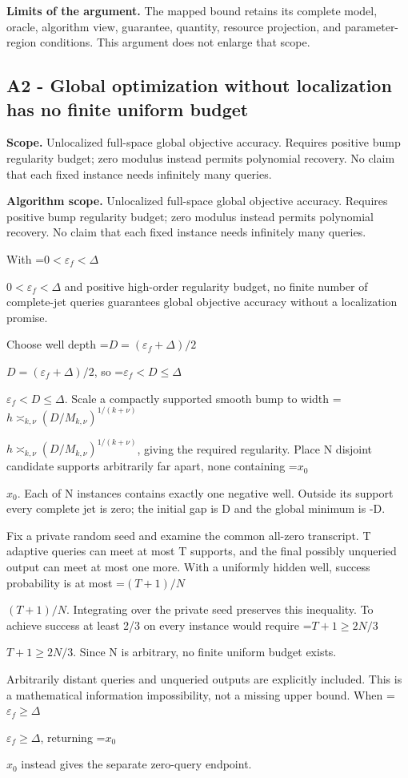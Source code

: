\documentclass[10pt,a4paper]{article}
\newcommand{\AtlasMath}[1]{\par\begingroup\centering\setbox0=\hbox{$\displaystyle #1$}\ifdim\wd0>1.4\linewidth\typeout{ATLAS WIDE FORMULA: \the\wd0}\fi\ifdim\wd0>\linewidth\resizebox{\linewidth}{!}{\box0}\else\box0\fi\par\endgroup}
\newcommand{\AtlasInlineMath}[1]{\begingroup\setbox0=\hbox{$#1$}\ifdim\wd0>.4\linewidth\endgroup\AtlasMath{#1}\else\endgroup$#1$\fi}
\begin{document}
\textbf{Limits of the argument.} The mapped bound retains its complete model, oracle, algorithm view, guarantee, quantity, resource projection, and parameter-region conditions. This argument does not enlarge that scope.

\subsection{A2 - Global optimization without localization has no finite uniform budget}
\textbf{Scope.} Unlocalized full-space global objective accuracy. Requires positive bump regularity budget; zero modulus instead permits polynomial recovery. No claim that each fixed instance needs infinitely many queries.

\textbf{Algorithm scope.} Unlocalized full-space global objective accuracy. Requires positive bump regularity budget; zero modulus instead permits polynomial recovery. No claim that each fixed instance needs infinitely many queries.

With \AtlasInlineMath{0<\varepsilon_f<\Delta} and positive high-order regularity budget, no finite number of complete-jet queries guarantees global objective accuracy without a localization promise.

Choose well depth \AtlasInlineMath{D=(\varepsilon_f+\Delta)/2}, so \AtlasInlineMath{\varepsilon_f<D\le\Delta}. Scale a compactly supported smooth bump to width \AtlasInlineMath{h\asymp_{k,\nu}(D/M_{k,\nu})^{1/(k+\nu)}}, giving the required regularity. Place N disjoint candidate supports arbitrarily far apart, none containing \AtlasInlineMath{x_0}. Each of N instances contains exactly one negative well. Outside its support every complete jet is zero; the initial gap is D and the global minimum is -D.

Fix a private random seed and examine the common all-zero transcript. T adaptive queries can meet at most T supports, and the final possibly unqueried output can meet at most one more. With a uniformly hidden well, success probability is at most \AtlasInlineMath{(T+1)/N}. Integrating over the private seed preserves this inequality. To achieve success at least 2/3 on every instance would require \AtlasInlineMath{T+1\ge2N/3}. Since N is arbitrary, no finite uniform budget exists.

Arbitrarily distant queries and unqueried outputs are explicitly included. This is a mathematical information impossibility, not a missing upper bound. When \AtlasInlineMath{\varepsilon_f\ge\Delta}, returning \AtlasInlineMath{x_0} instead gives the separate zero-query endpoint.
\end{document}
